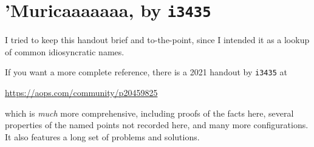 \documentclass[11pt]{scrartcl}
\begin{document}
\section{’Muricaaaaaaa, by \texttt{i3435}}
I tried to keep this handout brief and to-the-point,
since I intended it as a lookup of common idiosyncratic names.

If you want a more complete reference, there is a 2021 handout by \texttt{i3435} at
\begin{center}
  \url{https://aops.com/community/p20459825}
\end{center}
which is \emph{much} more comprehensive, including proofs of the facts here,
several properties of the named points not recorded here,
and many more configurations.
It also features a long set of problems and solutions.
\end{document}
